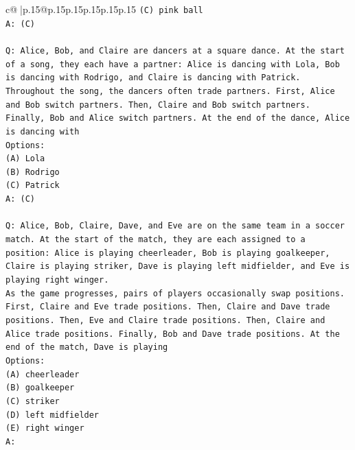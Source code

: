 \documentclass{article}
\begin{document}
{\begin{supertabular}{c@{$\;$}|p{.15\linewidth}@{}p{.15\linewidth}p{.15\linewidth}p{.15\linewidth}p{.15\linewidth}p{.15\linewidth}}
{{{\texttt{(C) pink ball} \\
\texttt{A: (C)} \\
\\ 
\texttt{Q: Alice, Bob, and Claire are dancers at a square dance. At the start of a song, they each have a partner: Alice is dancing with Lola, Bob is dancing with Rodrigo, and Claire is dancing with Patrick.} \\
\texttt{Throughout the song, the dancers often trade partners. First, Alice and Bob switch partners. Then, Claire and Bob switch partners. Finally, Bob and Alice switch partners. At the end of the dance, Alice is dancing with} \\
\texttt{Options:} \\
\texttt{(A) Lola} \\
\texttt{(B) Rodrigo} \\
\texttt{(C) Patrick} \\
\texttt{A: (C)} \\
\\ 
\texttt{Q: Alice, Bob, Claire, Dave, and Eve are on the same team in a soccer match. At the start of the match, they are each assigned to a position: Alice is playing cheerleader, Bob is playing goalkeeper, Claire is playing striker, Dave is playing left midfielder, and Eve is playing right winger.} \\
\texttt{As the game progresses, pairs of players occasionally swap positions. First, Claire and Eve trade positions. Then, Claire and Dave trade positions. Then, Eve and Claire trade positions. Then, Claire and Alice trade positions. Finally, Bob and Dave trade positions. At the end of the match, Dave is playing} \\
\texttt{Options:} \\
\texttt{(A) cheerleader} \\
\texttt{(B) goalkeeper} \\
\texttt{(C) striker} \\
\texttt{(D) left midfielder} \\
\texttt{(E) right winger} \\
\texttt{A:} \\
            }
        }
    }
     \\ \\


\end{supertabular}}
\end{document}
